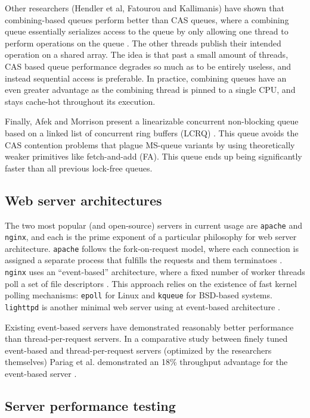 \documentclass[twoside,10pt]{article}
\begin{document}
\begin{multicols}{2}
Other researchers (Hendler et al, Fatourou and Kallimanis) have shown
that combining-based queues perform better than CAS queues, where a
combining queue essentially serializes access to the queue by only
allowing one thread to perform operations on the queue \cite{He10,
  FK12}. The other threads publish their intended operation on a
shared array. The idea is that past a small amount of threads, CAS
based queue performance degrades so much as to be entirely useless,
and instead sequential access is preferable. In practice, combining
queues have an even greater advantage as the combining thread is
pinned to a single CPU, and stays cache-hot throughout its execution.

Finally, Afek and Morrison present a linearizable concurrent
non-blocking queue based on a linked list of concurrent ring buffers
(LCRQ) \cite{AM13}. This queue avoids the CAS contention problems that
plague MS-queue variants by using theoretically weaker primitives like
fetch-and-add (FA). This queue ends up being significantly faster than
all previous lock-free queues.

\subsection{Web server architectures}

The two most popular (and open-source) servers in current usage are
\verb+apache+ and \verb+nginx+, and each is the prime exponent of a
particular philosophy for web server architecture. \verb+apache+
follows the fork-on-request model, where each connection is assigned a
separate process that fulfills the requests and them terminatoes
\cite{fielding1997apache}. \verb+nginx+ uses an ``event-based''
architecture, where a fixed number of worker threads poll a set of
file descriptors \cite{syosevnginx}. This approach relies on the
existence of fast kernel polling mechanisms: \verb+epoll+ for Linux
and \verb+kqueue+ for BSD-based systems. \verb+lighttpd+ is another
minimal web server using at event-based architecture
\cite{kneschke2003lighttpd}.

Existing event-based servers have demonstrated reasonably better
performance than thread-per-request servers. In a comparative study
between finely tuned event-based and thread-per-request servers
(optimized by the researchers themselves) Pariag et al. demonstrated
an 18\% throughput advantage for the event-based server
\cite{pariag2007comparing}.

\subsection{Server performance testing}


\end{multicols}
\end{document}
